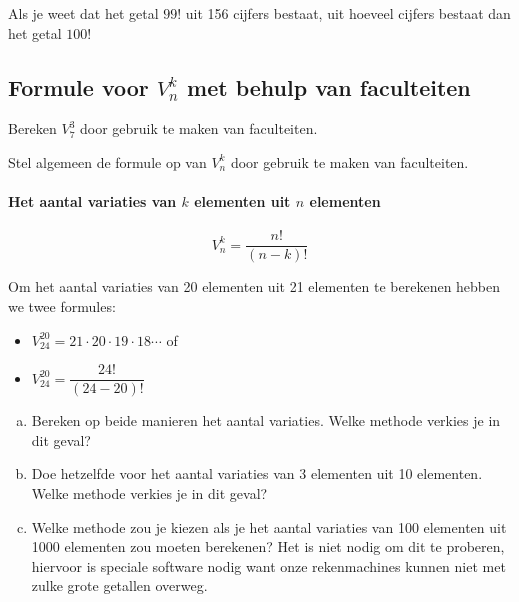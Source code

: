 \documentclass[12pt,twoside]{article}
\begin{document}
\begin{oefening}
Als je weet dat het getal $99!$ uit 156 cijfers bestaat, uit hoeveel cijfers bestaat dan het getal $100!$
\end{oefening}

\subsection{Formule voor $V^k_n$ met behulp van faculteiten}

\begin{oefening}
Bereken $V^3_7$ door gebruik te maken van faculteiten.
\end{oefening}

\begin{oefening}
Stel algemeen de formule op van $V^k_n$ door gebruik te maken van faculteiten.
\end{oefening}

\paragraph*{Het aantal variaties van $k$ elementen uit $n$ elementen}
\begin{mdframed}
$$V^k_n=\dfrac{n!}{(n-k)!}$$
\end{mdframed}

\begin{oefening}
Om het aantal variaties van 20 elementen uit 21 elementen te berekenen hebben we twee formules:\\
\begin{itemize}
  \itemsep1em
  \item $\displaystyle V^{20}_{24}=21\cdot20\cdot19\cdot18\cdots$ of
  \item $\displaystyle V^{20}_{24}=\dfrac{24!}{(24-20)!}$
\end{itemize}
\begin{enumerate}[(a)]
  \item Bereken op beide manieren het aantal variaties. Welke methode verkies je in dit geval?
  \item Doe hetzelfde voor het aantal variaties van 3 elementen uit 10 elementen. Welke methode verkies je in dit geval?
  \item Welke methode zou je kiezen als je het aantal variaties van 100 elementen uit 1000 elementen zou moeten berekenen? Het is niet nodig om dit te proberen, hiervoor is speciale software nodig want onze rekenmachines kunnen niet met zulke grote getallen overweg.
\end{enumerate}

\end{oefening}

\end{document}
